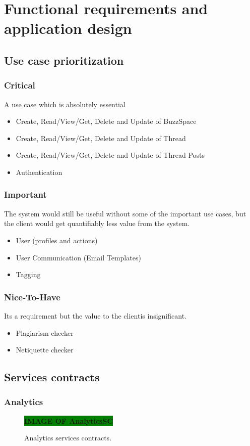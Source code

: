 \documentclass [a4paper,12pt] {article}
\begin{document}
\section{Functional requirements and application design}
	\subsection{Use case prioritization}
	\subsubsection{Critical}A use case which is absolutely essential
	\begin{itemize}
		\item Create, Read/View/Get, Delete and Update of BuzzSpace
		\item Create, Read/View/Get, Delete and Update of Thread
		\item Create, Read/View/Get, Delete and Update of Thread Posts
		\item Authentication	
	\end{itemize}
	\subsubsection{Important}The system would still be useful without some of the important use cases, but the client would get quantifiably less value from the system.
		\begin{itemize}
			\item User (profiles and actions)
			\item User Communication (Email Templates)
			\item Tagging
		\end{itemize}
	\subsubsection{Nice-To-Have}Its a requirement but the value to the clientis insignificant.
		\begin{itemize}
			\item Plagiarism checker
			\item Netiquette checker
		\end{itemize}

\pagebreak
	\subsection{Services contracts}
		\subsubsection{Analytics}
			\begin{figure}[H]
				\centering
				\large\textbf{\colorbox{green}{IMAGE OF AnalyticsSC}}
				\caption{Analytics services contracts.}
			\end{figure}
\end{document}
